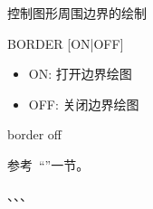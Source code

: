 \label{cmd:border}

控制图形周围边界的绘制

\begin{SACSTX}
BORDER [ON|OFF]
\end{SACSTX}

\begin{itemize}
\item ON: 打开边界绘图
\item OFF: 关闭边界绘图 
\end{itemize}

\begin{SACDFT}
border off
\end{SACDFT}

参考~``''一节。

、、、
